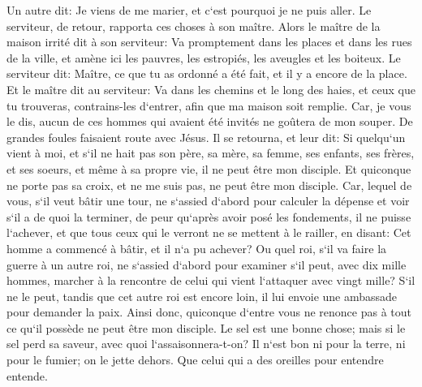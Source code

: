 \verse Un autre dit: Je viens de me marier, et c`est pourquoi je ne puis aller. 
\verse Le serviteur, de retour, rapporta ces choses à son maître. Alors le maître de la maison irrité dit à son serviteur: Va promptement dans les places et dans les rues de la ville, et amène ici les pauvres, les estropiés, les aveugles et les boiteux. 
\verse Le serviteur dit: Maître, ce que tu as ordonné a été fait, et il y a encore de la place. 
\verse Et le maître dit au serviteur: Va dans les chemins et le long des haies, et ceux que tu trouveras, contrains-les d`entrer, afin que ma maison soit remplie. 
\verse Car, je vous le dis, aucun de ces hommes qui avaient été invités ne goûtera de mon souper. 
\verse De grandes foules faisaient route avec Jésus. Il se retourna, et leur dit: 
\verse Si quelqu`un vient à moi, et s`il ne hait pas son père, sa mère, sa femme, ses enfants, ses frères, et ses soeurs, et même à sa propre vie, il ne peut être mon disciple. 
\verse Et quiconque ne porte pas sa croix, et ne me suis pas, ne peut être mon disciple. 
\verse Car, lequel de vous, s`il veut bâtir une tour, ne s`assied d`abord pour calculer la dépense et voir s`il a de quoi la terminer, 
\verse de peur qu`après avoir posé les fondements, il ne puisse l`achever, et que tous ceux qui le verront ne se mettent à le railler, 
\verse en disant: Cet homme a commencé à bâtir, et il n`a pu achever? 
\verse Ou quel roi, s`il va faire la guerre à un autre roi, ne s`assied d`abord pour examiner s`il peut, avec dix mille hommes, marcher à la rencontre de celui qui vient l`attaquer avec vingt mille? 
\verse S`il ne le peut, tandis que cet autre roi est encore loin, il lui envoie une ambassade pour demander la paix. 
\verse Ainsi donc, quiconque d`entre vous ne renonce pas à tout ce qu`il possède ne peut être mon disciple. 
\verse Le sel est une bonne chose; mais si le sel perd sa saveur, avec quoi l`assaisonnera-t-on? 
\verse Il n`est bon ni pour la terre, ni pour le fumier; on le jette dehors. Que celui qui a des oreilles pour entendre entende. 

